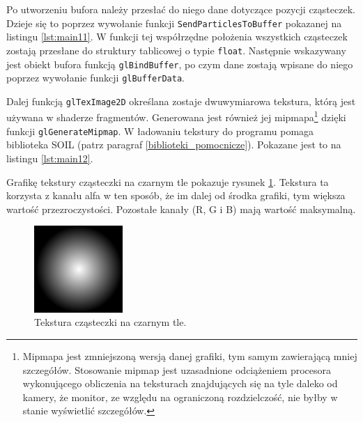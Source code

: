\documentclass[12pt, twoside, openany]{report}
\begin{document}


Po utworzeniu bufora należy przesłać do niego dane dotyczące pozycji cząsteczek. Dzieje się to poprzez wywołanie funkcji \texttt{SendParticlesToBuffer} pokazanej na listingu \ref{lst:main11}. W funkcji tej współrzędne położenia wszystkich cząsteczek zostają przesłane do struktury tablicowej o typie \texttt{float}. Następnie wskazywany jest obiekt bufora funkcją \texttt{glBindBuffer}, po czym dane zostają wpisane do niego poprzez wywołanie funkcji \texttt{glBufferData}.



Dalej funkcją \texttt{glTexImage2D} określana zostaje dwuwymiarowa tekstura, którą jest używana w shaderze fragmentów. Generowana jest również jej mipmapa\footnote{Mipmapa jest zmniejszoną wersją danej grafiki, tym samym zawierającą mniej szczegółów. Stosowanie mipmap jest uzasadnione odciążeniem procesora wykonującego obliczenia na teksturach znajdujących się na tyle daleko od kamery, że monitor, ze względu na ograniczoną rozdzielczość, nie byłby w stanie wyświetlić szczegółów.} dzięki funkcji \texttt{glGenerateMipmap}. W ładowaniu tekstury do programu pomaga biblioteka SOIL (patrz paragraf \ref{biblioteki_pomocnicze}). Pokazane jest to na listingu \ref{lst:main12}.



Grafikę tekstury cząsteczki na czarnym tle pokazuje rysunek \ref{fig:czasteczka}. Tekstura ta korzysta z kanału alfa w ten sposób, że im dalej od środka grafiki, tym większa wartość przezroczystości. Pozostałe kanały (R, G i B) mają wartość maksymalną.

\begin{figure}[H]
\centering
\includegraphics[width=0.3\textwidth,height=\textheight,keepaspectratio]{czasteczka.png}
\caption{Tekstura cząsteczki na czarnym tle.}
\label{fig:czasteczka}
\end{figure}
\end{document}
